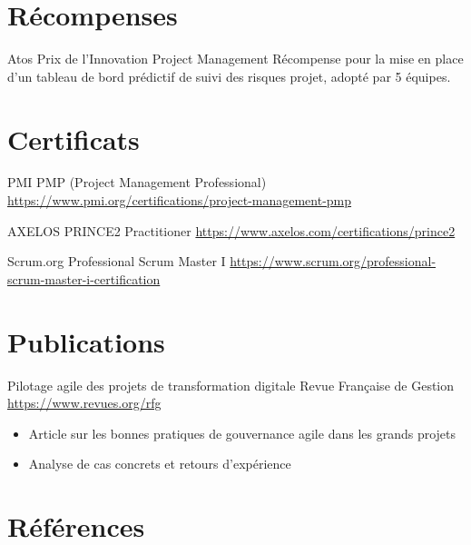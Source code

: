 \documentclass[a4paper, serif, 10pt]{moderncv}
\begin{document}
\section{Récompenses}

        {Atos}
        {Prix de l'Innovation Project Management}
        {}
        {}
        {Récompense pour la mise en place d'un tableau de bord prédictif de suivi des risques projet, adopté par 5 équipes.}
\section{Certificats}

        {PMI}
        {PMP (Project Management Professional)}
        {\url{https://www.pmi.org/certifications/project-management-pmp}}
        {}
        {}

        {AXELOS}
        {PRINCE2 Practitioner}
        {\url{https://www.axelos.com/certifications/prince2}}
        {}
        {}

        {Scrum.org}
        {Professional Scrum Master I}
        {\url{https://www.scrum.org/professional-scrum-master-i-certification}}
        {}
        {}
\section{Publications}

        {Pilotage agile des projets de transformation digitale}
        {Revue Française de Gestion}
        {\url{https://www.revues.org/rfg}}
        {}
        {\begin{itemize}
\item Article sur les bonnes pratiques de gouvernance agile dans les grands projets
\item Analyse de cas concrets et retours d'expérience
\end{itemize}}
\section{Références}
\end{document}
